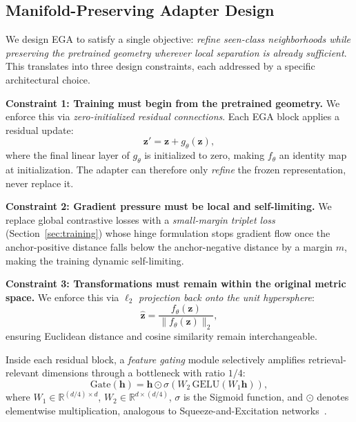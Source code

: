 \documentclass{article}
\begin{document}
\subsection{Manifold-Preserving Adapter Design}
\label{sec:design}

We design EGA to satisfy a single objective: \emph{refine seen-class neighborhoods while preserving the pretrained geometry wherever local separation is already sufficient}.
This translates into three design constraints, each addressed by a specific architectural choice.

\textbf{Constraint 1: Training must begin from the pretrained geometry.}
We enforce this via \emph{zero-initialized residual connections}.
Each EGA block applies a residual update:
\begin{equation}
    \mathbf{z}' = \mathbf{z} + g_\theta(\mathbf{z}),
    \label{eq:residual}
\end{equation}
where the final linear layer of $g_\theta$ is initialized to zero, making $f_\theta$ an identity map at initialization.
The adapter can therefore only \emph{refine} the frozen representation, never replace it.

\textbf{Constraint 2: Gradient pressure must be local and self-limiting.}
We replace global contrastive losses with a \emph{small-margin triplet loss} (Section~\ref{sec:training}) whose hinge formulation stops gradient flow once the anchor-positive distance falls below the anchor-negative distance by a margin $m$, making the training dynamic self-limiting.

\textbf{Constraint 3: Transformations must remain within the original metric space.}
We enforce this via $\ell_2$ \emph{projection back onto the unit hypersphere}:
\begin{equation}
    \hat{\mathbf{z}} = \frac{f_\theta(\mathbf{z})}{\|f_\theta(\mathbf{z})\|_2},
    \label{eq:l2norm}
\end{equation}
ensuring Euclidean distance and cosine similarity remain interchangeable.

Inside each residual block, a \emph{feature gating} module selectively amplifies retrieval-relevant dimensions through a bottleneck with ratio $1/4$:
\begin{equation}
    \text{Gate}(\mathbf{h}) = \mathbf{h} \odot \sigma\!\left(W_2\, \text{GELU}(W_1 \mathbf{h})\right),
    \label{eq:gate}
\end{equation}
where $W_1 \in \mathbb{R}^{(d/4) \times d}$, $W_2 \in \mathbb{R}^{d \times (d/4)}$, $\sigma$ is the Sigmoid function, and $\odot$ denotes elementwise multiplication, analogous to Squeeze-and-Excitation networks~\cite{hu2018squeeze}.
\end{document}
